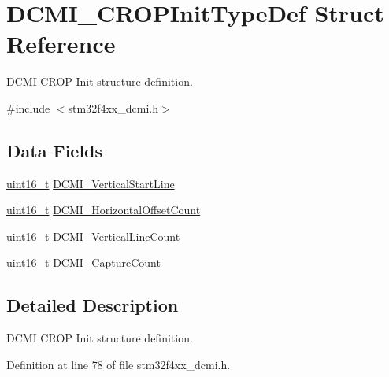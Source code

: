 \hypertarget{struct_d_c_m_i___c_r_o_p_init_type_def}{\section{D\-C\-M\-I\-\_\-\-C\-R\-O\-P\-Init\-Type\-Def Struct Reference}
\label{struct_d_c_m_i___c_r_o_p_init_type_def}
}


D\-C\-M\-I C\-R\-O\-P Init structure definition.  




{\ttfamily \#include $<$stm32f4xx\-\_\-dcmi.\-h$>$}

\subsection*{Data Fields}
\begin{DoxyCompactItemize}
\item 
\hyperlink{stdint_8h_a273cf69d639a59973b6019625df33e30}{uint16\-\_\-t} \hyperlink{struct_d_c_m_i___c_r_o_p_init_type_def_a4d4f4ef4975179f025d3cde589e380fe}{D\-C\-M\-I\-\_\-\-Vertical\-Start\-Line}
\item 
\hyperlink{stdint_8h_a273cf69d639a59973b6019625df33e30}{uint16\-\_\-t} \hyperlink{struct_d_c_m_i___c_r_o_p_init_type_def_a33a42e98f575145749f0003fdc99f947}{D\-C\-M\-I\-\_\-\-Horizontal\-Offset\-Count}
\item 
\hyperlink{stdint_8h_a273cf69d639a59973b6019625df33e30}{uint16\-\_\-t} \hyperlink{struct_d_c_m_i___c_r_o_p_init_type_def_aa12d393dbf969b568b4ec2a643456f20}{D\-C\-M\-I\-\_\-\-Vertical\-Line\-Count}
\item 
\hyperlink{stdint_8h_a273cf69d639a59973b6019625df33e30}{uint16\-\_\-t} \hyperlink{struct_d_c_m_i___c_r_o_p_init_type_def_af379a3ff9fddb38be10b5f50946b55d9}{D\-C\-M\-I\-\_\-\-Capture\-Count}
\end{DoxyCompactItemize}


\subsection{Detailed Description}
D\-C\-M\-I C\-R\-O\-P Init structure definition. 

Definition at line 78 of file stm32f4xx\-\_\-dcmi.\-h.



